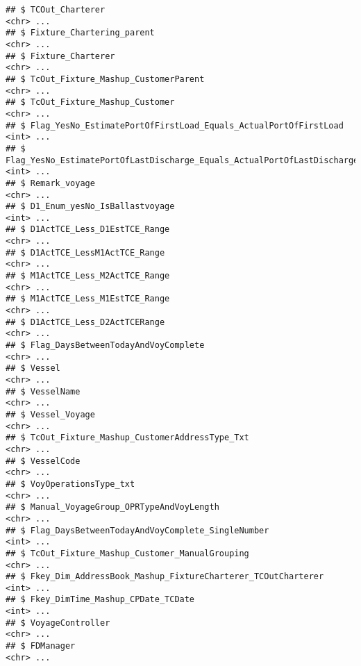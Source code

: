 \documentclass[]{article}
\newenvironment{Shaded}{\begin{snugshade}}{\end{snugshade}}
\newcommand{\KeywordTok}[1]{\textcolor[rgb]{0.13,0.29,0.53}{\textbf{#1}}}
\newcommand{\StringTok}[1]{\textcolor[rgb]{0.31,0.60,0.02}{#1}}
\newcommand{\CommentTok}[1]{\textcolor[rgb]{0.56,0.35,0.01}{\textit{#1}}}
\newcommand{\OperatorTok}[1]{\textcolor[rgb]{0.81,0.36,0.00}{\textbf{#1}}}
\newcommand{\NormalTok}[1]{#1}
\begin{document}
\begin{verbatim}
## $ TCOut_Charterer                                                         <chr> ...
## $ Fixture_Chartering_parent                                               <chr> ...
## $ Fixture_Charterer                                                       <chr> ...
## $ TcOut_Fixture_Mashup_CustomerParent                                     <chr> ...
## $ TcOut_Fixture_Mashup_Customer                                           <chr> ...
## $ Flag_YesNo_EstimatePortOfFirstLoad_Equals_ActualPortOfFirstLoad         <int> ...
## $ Flag_YesNo_EstimatePortOfLastDischarge_Equals_ActualPortOfLastDischarge <int> ...
## $ Remark_voyage                                                           <chr> ...
## $ D1_Enum_yesNo_IsBallastvoyage                                           <int> ...
## $ D1ActTCE_Less_D1EstTCE_Range                                            <chr> ...
## $ D1ActTCE_LessM1ActTCE_Range                                             <chr> ...
## $ M1ActTCE_Less_M2ActTCE_Range                                            <chr> ...
## $ M1ActTCE_Less_M1EstTCE_Range                                            <chr> ...
## $ D1ActTCE_Less_D2ActTCERange                                             <chr> ...
## $ Flag_DaysBetweenTodayAndVoyComplete                                     <chr> ...
## $ Vessel                                                                  <chr> ...
## $ VesselName                                                              <chr> ...
## $ Vessel_Voyage                                                           <chr> ...
## $ TcOut_Fixture_Mashup_CustomerAddressType_Txt                            <chr> ...
## $ VesselCode                                                              <chr> ...
## $ VoyOperationsType_txt                                                   <chr> ...
## $ Manual_VoyageGroup_OPRTypeAndVoyLength                                  <chr> ...
## $ Flag_DaysBetweenTodayAndVoyComplete_SingleNumber                        <int> ...
## $ TcOut_Fixture_Mashup_Customer_ManualGrouping                            <chr> ...
## $ Fkey_Dim_AddressBook_Mashup_FixtureCharterer_TCOutCharterer             <int> ...
## $ Fkey_DimTime_Mashup_CPDate_TCDate                                       <int> ...
## $ VoyageController                                                        <chr> ...
## $ FDManager                                                               <chr> ...
\end{verbatim}

\begin{Shaded}
\end{Shaded}
\end{document}
